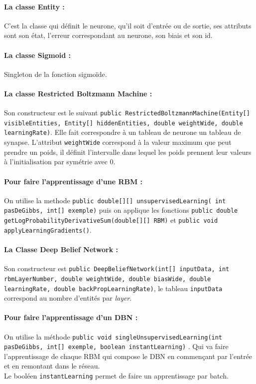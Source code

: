 \documentclass[a4paper,oneside]{report}
\begin{document}
\paragraph*{La classe Entity :} C'est la classe qui définit le neurone, qu'il soit d'entrée ou de sortie, ses attributs sont son état, l'erreur correspondant au neurone, son biais et son id.

\paragraph*{La classe Sigmoid :} Singleton de la fonction sigmoïde.

\paragraph*{La classe Restricted Boltzmann Machine :} Son constructeur est le suivant \texttt{public RestrictedBoltzmannMachine(Entity[] visibleEntities, Entity[] hiddenEntities, double weightWide, double learningRate)}. Elle fait correspondre à un tableau de neurone un tableau de synapse. L'attribut  \texttt{weightWide} correspond à la valeur maximum que peut prendre un poids, il définit l'intervalle dans lequel les poids prennent leur valeurs à l'initialisation par symétrie avec 0.

\paragraph*{Pour faire l'apprentissage d'une RBM :} On utilise la methode \texttt{public double[][] unsupervisedLearning( int pasDeGibbs, int[] exemple)} puis on applique les fonctions \texttt{public double getLogProbabilityDerivativeSum(double[][] RBM)} et \texttt{public void applyLearningGradients()}.

\paragraph*{La Classe Deep Belief Network :} Son constructeur est \texttt{public DeepBeliefNetwork(int[] inputData, int rbmLayerNumber, double weightWide, double biasWide, double learningRate, double backPropLearningRate)}, le tableau \texttt{inputData} correspond au nombre d'entités par \textit{layer}. 

\paragraph*{Pour faire l'apprentissage d'un DBN :} On utilise la méthode \texttt{public void singleUnsupervisedLearning(int pasDeGibbs, int[] exemple, boolean instantLearning)} . Qui va faire l'apprentissage de chaque RBM qui compose le DBN en commençant par l'entrée et en remontant dans le réseau.\\
Le booléen \texttt{instantLearning} permet de faire un apprentissage par batch.
\end{document}
